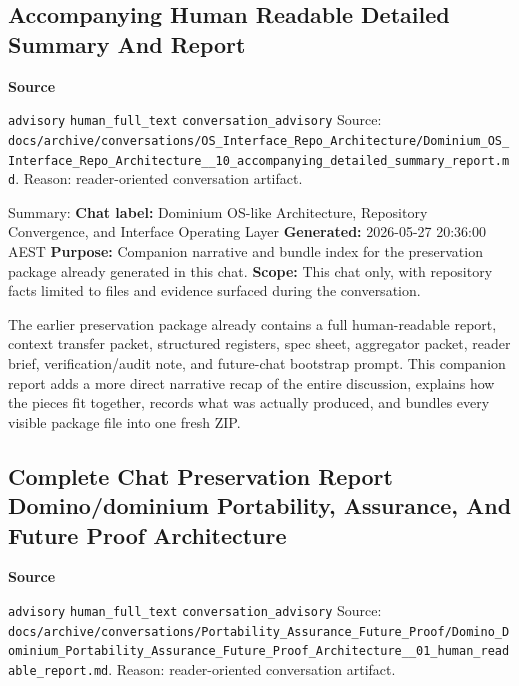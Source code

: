 \documentclass[9pt,a4paper,openany]{book}
\newcommand{\vonecallout}[3]{\par\medskip\noindent\begingroup\setlength{\fboxsep}{7pt}\colorbox{DomCalloutBg}{\parbox{0.94\linewidth}{\textbf{\textcolor{#1}{#2}}\par #3}}\endgroup\par\medskip}
\begin{document}
\subsection{Accompanying Human Readable Detailed Summary And Report}

\vonecallout{DomSlate}{Source}{\texttt{advisory} \texttt{human\_\allowbreak{}full\_\allowbreak{}text} \texttt{conversation\_\allowbreak{}advisory} Source: \texttt{docs/\allowbreak{}archive/\allowbreak{}conversations/\allowbreak{}OS\_\allowbreak{}Interface\_\allowbreak{}Repo\_\allowbreak{}Architecture/\allowbreak{}Dominium\_\allowbreak{}OS\_\allowbreak{}Interface\_\allowbreak{}Repo\_\allowbreak{}Architecture\_\allowbreak{}\_\allowbreak{}10\_\allowbreak{}accompanying\_\allowbreak{}detailed\_\allowbreak{}summary\_\allowbreak{}report.\allowbreak{}md}.\allowbreak{} Reason: reader-\allowbreak{}oriented conversation artifact.\allowbreak{}}

Summary: \textbf{Chat label:} Dominium OS-\allowbreak{}like Architecture, Repository Convergence, and Interface Operating Layer \textbf{Generated:} 2026-\allowbreak{}05-\allowbreak{}27 20:36:00 AEST \textbf{Purpose:} Companion narrative and bundle index for the preservation package already generated in this chat.\allowbreak{} \textbf{Scope:} This chat only, with repository facts limited to files and evidence surfaced during the conversation.\allowbreak{}


The earlier preservation package already contains a full human-\allowbreak{}readable report, context transfer packet, structured registers, spec sheet, aggregator packet, reader brief, verification/\allowbreak{}audit note, and future-\allowbreak{}chat bootstrap prompt.\allowbreak{} This companion report adds a more direct narrative recap of the entire discussion, explains how the pieces fit together, records what was actually produced, and bundles every visible package file into one fresh ZIP.\allowbreak{}



\subsection{Complete Chat Preservation Report Domino/dominium Portability, Assurance, And Future Proof Architecture}

\vonecallout{DomSlate}{Source}{\texttt{advisory} \texttt{human\_\allowbreak{}full\_\allowbreak{}text} \texttt{conversation\_\allowbreak{}advisory} Source: \texttt{docs/\allowbreak{}archive/\allowbreak{}conversations/\allowbreak{}Portability\_\allowbreak{}Assurance\_\allowbreak{}Future\_\allowbreak{}Proof/\allowbreak{}Domino\_\allowbreak{}Dominium\_\allowbreak{}Portability\_\allowbreak{}Assurance\_\allowbreak{}Future\_\allowbreak{}Proof\_\allowbreak{}Architecture\_\allowbreak{}\_\allowbreak{}01\_\allowbreak{}human\_\allowbreak{}readable\_\allowbreak{}report.\allowbreak{}md}.\allowbreak{} Reason: reader-\allowbreak{}oriented conversation artifact.\allowbreak{}}
\end{document}
